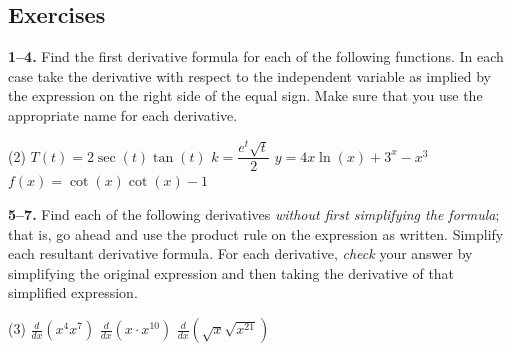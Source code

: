 \documentclass[10pt,oneside,]{book}
\theoremstyle{plain}
\theoremstyle{definition}
\numberwithin{equation}{section}
\newcommand{\fe}[2]{#1\mathopen{}\left(#2\right)\mathclose{}}
\newcommand{\lzoo}[2]{{\frac{d}{d#1}}{\left(#2\right)}}
\begin{document}
\subsection[Exercises]{Exercises}\label{exercises-37}
\textbf{1--4. }\hypertarget{exercisegroup-76}{\null}Find the first derivative formula for each of the following functions.  In each case take the derivative with respect to the independent variable as implied by the expression on the right side of the equal sign.  Make sure that you use the appropriate name for each derivative.%
\par
\begin{exercisegroup}(2)
\exercise[1.]\hypertarget{exercise-372}{\null}\(\fe{T}{t}=2\fe{\sec}{t}\fe{\tan}{t}\)%
\exercise[2.]\hypertarget{exercise-373}{\null}\(k=\dfrac{e^t\sqrt{t}}{2}\)%
\exercise[3.]\hypertarget{exercise-374}{\null}\(y=4x\fe{\ln}{x}+3^x-x^3\)%
\exercise[4.]\hypertarget{exercise-375}{\null}\(\fe{f}{x}=\fe{\cot}{x}\fe{\cot}{x}-1\)%
\end{exercisegroup}
\par\smallskip\noindent
\textbf{5--7. }\hypertarget{exercisegroup-unsimplified-product}{\null}Find each of the following derivatives \emph{without first simplifying the formula}; that is, go ahead and use the product rule on the expression as written. Simplify each resultant derivative formula.  For each derivative, \emph{check} your answer by simplifying the original expression and then taking the derivative of that simplified expression.%
\par
\begin{exercisegroup}(3)
\exercise[5.]\hypertarget{unsimplified-product-first}{\null}\(\lzoo{x}{x^4x^7}\)%
\exercise[6.]\hypertarget{exercise-377}{\null}\(\lzoo{x}{x\cdot x^{10}}\)%
\exercise[7.]\hypertarget{unsimplified-product-last}{\null}\(\lzoo{x}{\sqrt{x}\sqrt{x^{21}}}\)%
\end{exercisegroup}
\par\smallskip\noindent
\typeout{************************************************}
\typeout{************************************************}
\end{document}

